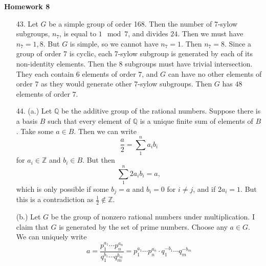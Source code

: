 \documentclass[11pt, reqno]{article}
\theoremstyle{plain}
\theoremstyle{definition}
\theoremstyle{remark}
\newcommand{\ZZ}{\mathbb{Z}}
\newcommand{\QQ}{\mathbb{Q}}
\begin{document}
\topmargin=-40pt
\renewcommand{\headrulewidth}{1pt}
\renewcommand{\headsep}{20pt}
\thispagestyle{fancy}

{\Huge \bfseries \noindent Homework 8}

\begin{enumerate}
    \item[43.] Let $G$ be a simple group of order 168. Then the number of 7-sylow subgroups, $n_7$,
    is equal to $1 \mod 7$, and divides $24$. Then we must have $n_7 = 1, 8$. But $G$ is simple,
    so we cannot have $n_7 = 1$. Then $n_7 = 8$. Since a group of order 7 is cyclic, each 7-sylow
    subgroup is generated by each of its non-identity elements. Then the 8 subgroups must have trivial
    intersection. They each contain $6$ elements of order $7$, and $G$ can have no other 
    elements of order $7$ as they would generate other 7-sylow subgroups. Then $G$ has 
    $48$ elements of order $7$.

    \item[44.] (a.) Let $\QQ$ be the additive group of the rational numbers. Suppose there is 
    a basis $B$ such that every element of $\QQ$ is a unique finite sum of elements of $B$. Take
    some $a \in B$. Then we can write
    \[
        \frac{a}{2} = \sum_1^n a_i b_i
    \]
    for $a_i \in \ZZ$ and $b_i \in B$. But then 
    \[
        \sum_1^n 2a_i b_i = a,
    \]
    which is only possible if some $b_j = a$ and $b_i = 0$ for $i \neq j$, and if $2a_i = 1$. But
    this is a contradiction as $\frac{1}{2} \notin \ZZ$. 

    (b.) Let $G$ be the group of nonzero rational numbers under multiplication. I claim that $G$
    is generated by the set of prime numbers. Choose any $a \in G$. We can uniquely write
    \[
        a = \frac{p_1^{a_1}\cdots p_n^{a_n}}{q_1^{b_1}\cdots q_m^{b_m}} = 
        p_1^{a_1}\cdots p_n^{a_n}\cdot q_1^{-b_1}\cdots q_m^{-b_m}
    \]

\end{enumerate}
\end{document}
